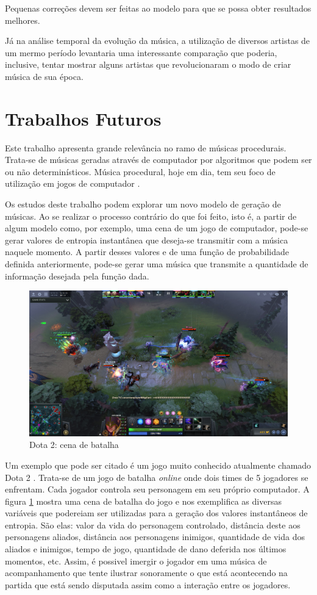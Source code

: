 Pequenas correções devem ser feitas ao modelo para que se possa obter resultados melhores.

Já na análise temporal da evolução da música, a utilização de diversos artistas de um mermo período levantaria uma interessante comparação que poderia, inclusive, tentar mostrar alguns artistas que revolucionaram o modo de criar música de sua época.

\section{Trabalhos Futuros}

Este trabalho apresenta grande relevância no ramo de músicas procedurais. Trata-se de músicas geradas através de computador por algoritmos que podem ser ou não determinísticos. Música procedural, hoje em dia, tem seu foco de utilização em jogos de computador \cite{procedural}.

Os estudos deste trabalho podem explorar um novo modelo de geração de músicas. Ao se realizar o processo contrário do que foi feito, isto é, a partir de algum modelo como, por exemplo, uma cena de um jogo de computador, pode-se gerar valores de entropia instantânea que deseja-se transmitir com a música naquele momento. A partir desses valores e de uma função de probabilidade definida anteriormente, pode-se gerar uma música que transmite a quantidade de informação desejada pela função dada.

\begin{figure}[h]
    \centering
    \includegraphics[width=\textwidth]{Cap4/dota.jpg}
    \caption{Dota 2: cena de batalha}
    \label{fig:dota}
\end{figure}

Um exemplo que pode ser citado é um jogo muito conhecido atualmente chamado Dota 2 \cite{dota}. Trata-se de um jogo de batalha \textit{online} onde dois times de 5 jogadores se enfrentam. Cada jogador controla seu personagem em seu próprio computador. A figura \ref{fig:dota} mostra uma cena de batalha do jogo e nos exemplifica as diversas variáveis que podereiam ser utilizadas para a geração dos valores instantâneos de entropia. São elas: valor da vida do personagem controlado, distância deste aos personagens aliados, distância aos personagens inimigos, quantidade de vida dos aliados e inimigos, tempo de jogo, quantidade de dano deferida nos últimos momentos, etc. Assim, é possivel imergir o jogador em uma música de acompanhamento que tente ilustrar sonoramente o que está acontecendo na partida que está sendo disputada assim como a interação entre os jogadores.
